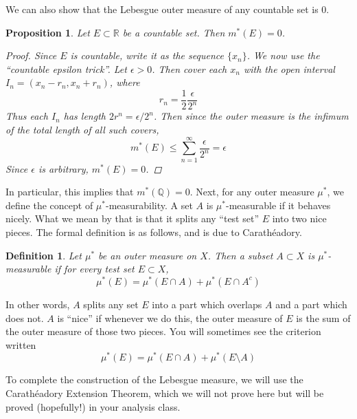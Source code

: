 \documentclass[10pt]{article}         %
\newtheorem{definition}{Definition}[section]
\newtheorem{proposition}{Proposition}[section]
\theoremstyle{remark}
\newcommand{\R}{\mathbb{R}}
\newcommand{\Q}{\mathbb{Q}}
\begin{document}
We can also show that the Lebesgue outer measure of any countable set is 0.

\begin{proposition}
Let $E \subset \R$ be a countable set. Then $m^*(E) = 0$.
\begin{proof}
Since $E$ is countable, write it as the sequence $\{x_n\}$. We now use the ``countable epsilon trick''. Let $\epsilon > 0$. Then cover each $x_n$ with the open interval $I_n = (x_n - r_n, x_n + r_n)$, where
\[
r_n = \frac{1}{2} \frac{\epsilon}{2^n}
\]
Thus each $I_n$ has length $2 r^n = \epsilon/2^n$. Then since the outer measure is the infimum of the total length of all such covers,
\[
m^*(E) \leq \sum_{n=1}^{\infty} \frac{\epsilon}{2^n} = \epsilon
\]
Since $\epsilon$ is arbitrary, $m^*(E) = 0$.
\end{proof}
\end{proposition}

In particular, this implies that $m^*(\Q) = 0$. Next, for any outer measure $\mu^*$, we define the concept of $\mu^*$-measurability. A set $A$ is $\mu^*$-measurable if it behaves nicely. What we mean by that is that it splits any ``test set'' $E$ into two nice pieces. The formal definition is as follows, and is due to Carath\'{e}adory.

\begin{definition}
Let $\mu^*$ be an outer measure on $X$. Then a subset $A \subset X$ is \emph{$\mu^*$-measurable} if for every test set $E \subset X$,
\[
\mu^*(E) = \mu^*(E \cap A) + \mu^*(E \cap A^c)
\]
\end{definition}
In other words, $A$ splits any set $E$ into a part which overlaps $A$ and a part which does not. $A$ is ``nice'' if whenever we do this, the outer measure of $E$ is the sum of the outer measure of those two pieces. You will sometimes see the criterion written
\[
\mu^*(E) = \mu^*(E \cap A) + \mu^*(E \setminus A)
\]

To complete the construction of the Lebesgue measure, we will use the Carath\'{e}adory Extension Theorem, which we will not prove here but will be proved (hopefully!) in your analysis class.
\end{document}
